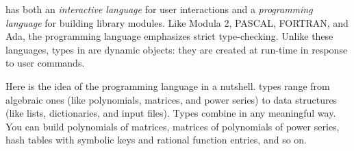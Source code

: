 
%
%
%
%
%


\Language{} has both
an {\it interactive
language} for user interactions and a
{\it programming language} for building library modules.
Like Modula 2,
PASCAL,
FORTRAN,
and Ada,
the programming language emphasizes strict type-checking.
Unlike these languages, types in \Language{} are dynamic
objects: they are created at run-time in response to user
commands.

Here is the idea of the \Language{} programming language in a nutshell.
\Language{} types range from
algebraic ones (like polynomials,
matrices, and power series) to data structures (like
lists, dictionaries, and input files).
Types combine in any meaningful way.
You can build
polynomials of matrices, matrices of polynomials of
power series, hash tables with symbolic keys and rational function entries,
and so on.

